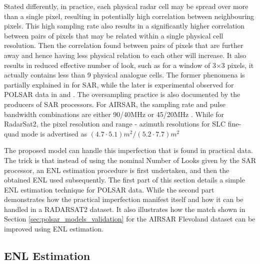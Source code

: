 \documentclass[journal]{IEEEtran}
\begin{document}
Stated differently, in practice, each physical radar cell may be spread over more than a single pixel,
 resulting in potentially high correlation between neighbouring pixels.
This high sampling rate also results in 
  a significantly higher correlation between pairs of pixels that may be related within a single physical cell resolution. 
  Then the correlation found between pairs of pixels that are further away and hence having less physical relation to each other will increase.
It also results in reduced effective number of look, 
  such as for a window of 3$\times$3 pixels, it actually contains less than 9 physical analogue cells. 
The former phenomena is partially explained in \cite{Raney_1988_TGRS_666} for SAR,
  while the later is experimental observed for POLSAR data in \cite{Lee_1994_TGRS_1017} and \cite{Anfinsen_2009_TGRS_3795}.
The oversampling practice is also documented by the producers of SAR processors.
For AIRSAR, the sampling rate and pulse bandwidth combinations are either 90/40MHz or 45/20MHz \cite{JPL_2013_Web_AIRSAR_Impl}.
While for RadarSat2, the pixel resolution and range - azimuth resolutions for SLC fine-quad mode is advertised as $(4.7 \cdot 5.1)m^2/(5.2 \cdot 7.7)m^2$ \cite{MDA_2013_Web_RadatSat2_Description}

The proposed model can handle this imperfection that is found in practical data.
The trick is that instead of using the nominal Number of Looks given by the SAR processor,
  an ENL estimation procedure is first undertaken, and then the obtained ENL used subsequently. %
The first part of this section details a simple ENL estimation technique for POLSAR data.
While the second part demonstrates how the practical imperfection manifest itself and how it can be handled in a RADARSAT2 dataset.
It also illustrates how the match shown in Section \ref{sec:polsar_models_validation} for the AIRSAR Flevoland dataset can be improved using ENL estimation.

\subsection{ENL Estimation}
\end{document}
